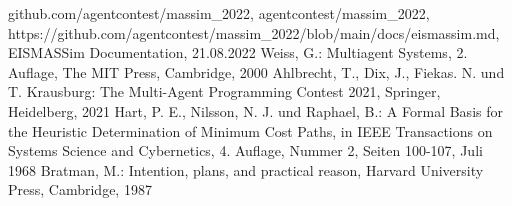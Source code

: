 \documentclass[runningheads]{llncs}
\begin{document}
%
%
%
% 
% 
%
\begin{thebibliography}{8}
	github.com/agentcontest/massim\_2022, agentcontest/massim\_2022, \\ https://github.com/agentcontest/massim\_2022/blob/main/docs/eismassim.md, EISMASSim Documentation, 21.08.2022
	Weiss, G.: Multiagent Systems, 2. Auflage, The MIT Press, Cambridge, 2000
	Ahlbrecht, T., Dix, J., Fiekas. N. und T. Krausburg: The Multi-Agent Programming Contest 2021, Springer, Heidelberg, 2021
	Hart, P. E., Nilsson, N. J. und Raphael, B.: A Formal Basis for the Heuristic Determination of Minimum Cost Paths, in IEEE Transactions on Systems Science and Cybernetics, 4. Auflage, Nummer 2, Seiten 100-107, Juli 1968
	Bratman, M.: Intention, plans, and practical reason, Harvard University Press, Cambridge, 1987
\end{thebibliography}
\end{document}
